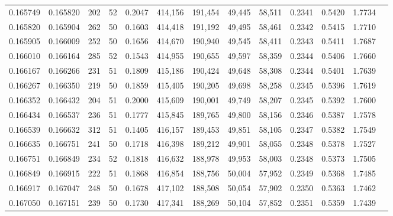 \begin{tabular}{rrrrrrrrrrrrr}
0.165749 & 0.165820 &   202 &  52 &                                     0.2047 & 414,156 & 191,454 &  49,445 &  58,511 & 0.2341 & 0.5420 & 1.7734 \\
0.165820 & 0.165904 &   262 &  50 &                                     0.1603 & 414,418 & 191,192 &  49,495 &  58,461 & 0.2342 & 0.5415 & 1.7710 \\
0.165905 & 0.166009 &   252 &  50 &                                     0.1656 & 414,670 & 190,940 &  49,545 &  58,411 & 0.2343 & 0.5411 & 1.7687 \\
0.166010 & 0.166164 &   285 &  52 &                                     0.1543 & 414,955 & 190,655 &  49,597 &  58,359 & 0.2344 & 0.5406 & 1.7660 \\
0.166167 & 0.166266 &   231 &  51 &                                     0.1809 & 415,186 & 190,424 &  49,648 &  58,308 & 0.2344 & 0.5401 & 1.7639 \\
0.166267 & 0.166350 &   219 &  50 &                                     0.1859 & 415,405 & 190,205 &  49,698 &  58,258 & 0.2345 & 0.5396 & 1.7619 \\
0.166352 & 0.166432 &   204 &  51 &                                     0.2000 & 415,609 & 190,001 &  49,749 &  58,207 & 0.2345 & 0.5392 & 1.7600 \\
0.166434 & 0.166537 &   236 &  51 &                                     0.1777 & 415,845 & 189,765 &  49,800 &  58,156 & 0.2346 & 0.5387 & 1.7578 \\
0.166539 & 0.166632 &   312 &  51 &                                     0.1405 & 416,157 & 189,453 &  49,851 &  58,105 & 0.2347 & 0.5382 & 1.7549 \\
0.166635 & 0.166751 &   241 &  50 &                                     0.1718 & 416,398 & 189,212 &  49,901 &  58,055 & 0.2348 & 0.5378 & 1.7527 \\
0.166751 & 0.166849 &   234 &  52 &                                     0.1818 & 416,632 & 188,978 &  49,953 &  58,003 & 0.2348 & 0.5373 & 1.7505 \\
0.166849 & 0.166915 &   222 &  51 &                                     0.1868 & 416,854 & 188,756 &  50,004 &  57,952 & 0.2349 & 0.5368 & 1.7485 \\
0.166917 & 0.167047 &   248 &  50 &                                     0.1678 & 417,102 & 188,508 &  50,054 &  57,902 & 0.2350 & 0.5363 & 1.7462 \\
0.167050 & 0.167151 &   239 &  50 &                                     0.1730 & 417,341 & 188,269 &  50,104 &  57,852 & 0.2351 & 0.5359 & 1.7439 \\

\end{tabular}
